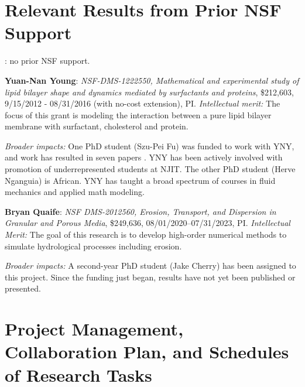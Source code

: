 \section{Relevant Results from Prior NSF Support}
: no prior NSF support.

\noindent
{\bf Yuan-Nan Young}: {\em NSF-DMS-1222550, Mathematical and
experimental study of lipid bilayer shape and dynamics mediated by
surfactants and proteins}, \$212,603, 9/15/2012 - 08/31/2016 (with
no-cost extension), PI. {\em Intellectual merit:} The focus of this
grant is modeling the interaction between a pure lipid bilayer membrane
with surfactant, cholesterol and protein.


\noindent
{\it Broader impacts:} 
One PhD student (Szu-Pei Fu) was funded to work with YNY, and work has
resulted in seven papers
\cite{Nganguia2013_PoF,Nganguia2013_PRE,Young2014_JFM,Young2015_PoF,Nganguia2015_CiCP,Pak2015_PNAS,fu2015pre}.
YNY has been actively involved with promotion of underrepresented
students at NJIT. The other PhD student (Herve Nganguia) is African.
YNY has taught a broad spectrum of courses in fluid mechanics and
applied math modeling.

\noindent
{\bf Bryan Quaife}: {\em NSF DMS-2012560, Erosion, Transport, and
Dispersion in Granular and Porous Media}, \$249,636,
08/01/2020--07/31/2023, PI. {\em Intellectual Merit:} The goal of this
research is to develop high-order numerical methods to
simulate hydrological processes including erosion.

\noindent
{\it Broader impacts:} 
A second-year PhD student (Jake Cherry) has been assigned to this
project. Since the funding just began, results have not yet
been published or presented. 

\section{Project Management, Collaboration Plan, and Schedules of
Research Tasks}
\setlength{\parindent}{0pt}


